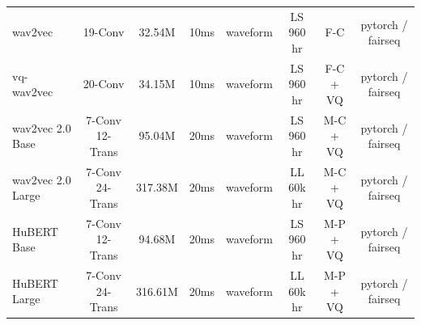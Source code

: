 \documentclass[a4paper]{article}
\begin{document}
\begin{table}[ht]
{\begin{tabular}{|l||c|c|c|c|c|c|c|}
wav2vec~\cite{wav2vec} & 19-Conv & 32.54M & 10ms & waveform & LS 960 hr & F-C & pytorch / fairseq \\

vq-wav2vec~\cite{vq_wav2vec} & 20-Conv & 34.15M & 10ms & waveform & LS 960 hr & F-C + VQ & pytorch / fairseq \\

wav2vec 2.0 Base~\cite{wav2vec2} & 7-Conv 12-Trans & 95.04M & 20ms & waveform & LS 960 hr & M-C + VQ & pytorch / fairseq \\

wav2vec 2.0 Large~\cite{wav2vec2} & 7-Conv 24-Trans & 317.38M & 20ms & waveform & LL 60k hr & M-C + VQ & pytorch / fairseq \\

HuBERT Base~\cite{hsu2021hubert} & 7-Conv 12-Trans & 94.68M & 20ms & waveform & LS 960 hr & M-P + VQ & pytorch / fairseq \\

HuBERT Large~\cite{hsu2021hubert} & 7-Conv 24-Trans & 316.61M & 20ms & waveform & LL 60k hr & M-P + VQ & pytorch / fairseq \\
\hline
\end{tabular}}
\label{table:upstreams}
\end{table}

\end{document}
